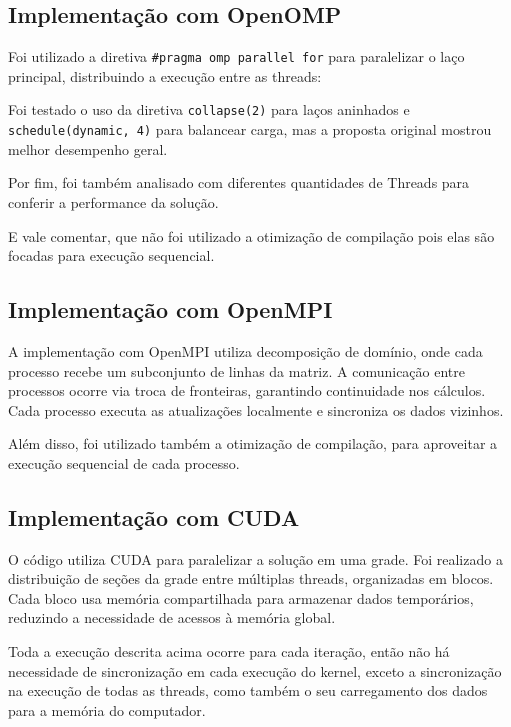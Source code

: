 \subsection{Implementação com OpenOMP}

Foi utilizado a diretiva \texttt{\#pragma omp parallel for} para paralelizar o laço principal, distribuindo a execução entre as threads:

Foi testado o uso da diretiva \texttt{collapse(2)} para laços aninhados e \texttt{schedule(dynamic, 4)} para balancear carga, mas a proposta original mostrou melhor desempenho geral.

Por fim, foi também analisado com diferentes quantidades de Threads para conferir a performance da solução.

E vale comentar, que não foi utilizado a otimização de compilação pois elas são focadas para execução sequencial.

\subsection{Implementação com OpenMPI}

A implementação com OpenMPI utiliza decomposição de domínio, onde cada processo recebe um subconjunto de linhas da matriz.
A comunicação entre processos ocorre via troca de fronteiras, garantindo continuidade nos cálculos.
Cada processo executa as atualizações localmente e sincroniza os dados vizinhos.

Além disso, foi utilizado também a otimização de compilação, para aproveitar a execução sequencial de cada processo.

\subsection{Implementação com CUDA}

O código utiliza CUDA para paralelizar a solução em uma grade.
Foi realizado a distribuição de seções da grade entre múltiplas threads, organizadas em blocos.
Cada bloco usa memória compartilhada para armazenar dados temporários, reduzindo a necessidade de acessos à memória global.


Toda a execução descrita acima ocorre para cada iteração, então não há necessidade de sincronização em cada execução do kernel,
exceto a sincronização na execução de todas as threads, como também o seu carregamento dos dados para a memória do computador.
